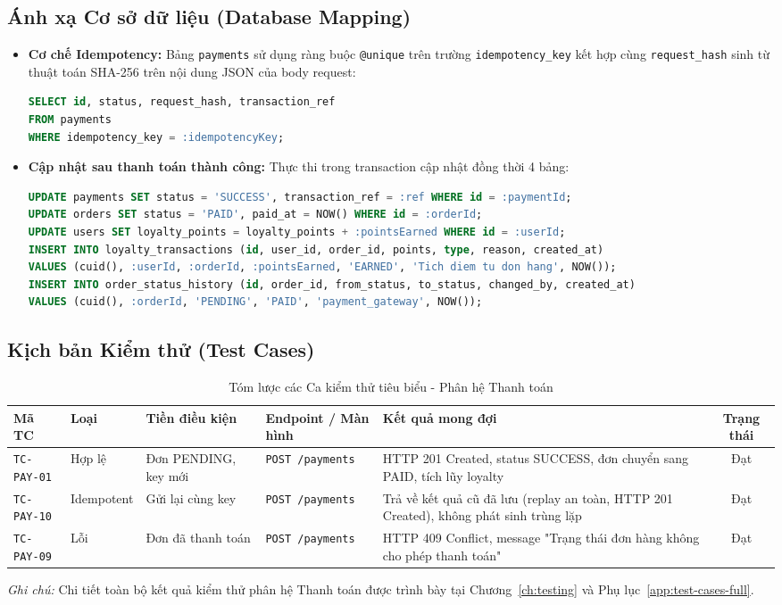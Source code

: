 \documentclass[12pt,a4paper,oneside]{report}
\begin{document}
\subsection{Ánh xạ Cơ sở dữ liệu (Database Mapping)}
\begin{itemize}
    \item \textbf{Cơ chế Idempotency:} Bảng \texttt{payments} sử dụng ràng buộc \texttt{@unique} trên trường \texttt{idempotency\_key} kết hợp cùng \texttt{request\_hash} sinh từ thuật toán SHA-256 trên nội dung JSON của body request:
    \begin{lstlisting}[language=SQL]
SELECT id, status, request_hash, transaction_ref 
FROM payments 
WHERE idempotency_key = :idempotencyKey;
    \end{lstlisting}
    \item \textbf{Cập nhật sau thanh toán thành công:} Thực thi trong transaction cập nhật đồng thời 4 bảng:
    \begin{lstlisting}[language=SQL]
UPDATE payments SET status = 'SUCCESS', transaction_ref = :ref WHERE id = :paymentId;
UPDATE orders SET status = 'PAID', paid_at = NOW() WHERE id = :orderId;
UPDATE users SET loyalty_points = loyalty_points + :pointsEarned WHERE id = :userId;
INSERT INTO loyalty_transactions (id, user_id, order_id, points, type, reason, created_at)
VALUES (cuid(), :userId, :orderId, :pointsEarned, 'EARNED', 'Tich diem tu don hang', NOW());
INSERT INTO order_status_history (id, order_id, from_status, to_status, changed_by, created_at)
VALUES (cuid(), :orderId, 'PENDING', 'PAID', 'payment_gateway', NOW());
    \end{lstlisting}
\end{itemize}

\subsection{Kịch bản Kiểm thử (Test Cases)}
\begin{table}[H]
\centering
\small
\caption{Tóm lược các Ca kiểm thử tiêu biểu - Phân hệ Thanh toán}
\label{tab:tc-payment}
\begin{tabularx}{\textwidth}{llp{2.6cm}p{3cm}Xc}
\toprule
\textbf{Mã TC} & \textbf{Loại} & \textbf{Tiền điều kiện} & \textbf{Endpoint / Màn hình} & \textbf{Kết quả mong đợi} & \textbf{Trạng thái} \\
\midrule
\texttt{TC-PAY-01} & Hợp lệ & Đơn PENDING, key mới & \texttt{POST /payments} & HTTP 201 Created, status SUCCESS, đơn chuyển sang PAID, tích lũy loyalty & Đạt \\
\texttt{TC-PAY-10} & Idempotent & Gửi lại cùng key & \texttt{POST /payments} & Trả về kết quả cũ đã lưu (replay an toàn, HTTP 201 Created), không phát sinh trùng lặp & Đạt \\
\texttt{TC-PAY-09} & Lỗi & Đơn đã thanh toán & \texttt{POST /payments} & HTTP 409 Conflict, message "Trạng thái đơn hàng không cho phép thanh toán" & Đạt \\
\bottomrule
\end{tabularx}
\end{table}
\noindent\textit{Ghi chú:} Chi tiết toàn bộ kết quả kiểm thử phân hệ Thanh toán được trình bày tại Chương~\ref{ch:testing} và Phụ lục~\ref{app:test-cases-full}.
\end{document}
